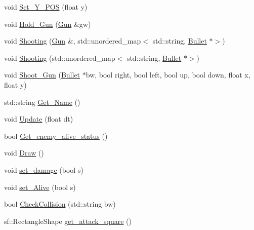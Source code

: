\begin{DoxyCompactItemize}
\item 
void \hyperlink{classSekander_1_1Enemy_a796c49f19dafbec62ce907e6ea8c90cb}{Set\+\_\+\+Y\+\_\+\+P\+OS} (float y)
\item 
void \hyperlink{classSekander_1_1Enemy_ada6336570f2bbc3294cab31247ff21a9}{Hold\+\_\+\+Gun} (\hyperlink{classSekander_1_1Gun}{Gun} \&gw)
\item 
void \hyperlink{classSekander_1_1Enemy_a53a51c2c7734f378c1ea3fb21f47de0b}{Shooting} (\hyperlink{classSekander_1_1Gun}{Gun} \&, std\+::unordered\+\_\+map$<$ std\+::string, \hyperlink{classSekander_1_1Bullet}{Bullet} $\ast$$>$)
\item 
void \hyperlink{classSekander_1_1Enemy_aaf647778a6a1a598006fc905ed98df66}{Shooting} (std\+::unordered\+\_\+map$<$ std\+::string, \hyperlink{classSekander_1_1Bullet}{Bullet} $\ast$$>$)
\item 
void \hyperlink{classSekander_1_1Enemy_a96b8ac3dfecca684c03179f01606ba38}{Shoot\+\_\+\+Gun} (\hyperlink{classSekander_1_1Bullet}{Bullet} $\ast$bw, bool right, bool left, bool up, bool down, float x, float y)
\item 
std\+::string \hyperlink{classSekander_1_1Enemy_a1db56100425ba6f05092351fc37330e6}{Get\+\_\+\+Name} ()
\item 
void \hyperlink{classSekander_1_1Enemy_aaccf2d86ea82595234cee826bc176cfa}{Update} (float dt)
\item 
bool \hyperlink{classSekander_1_1Enemy_aebe5e0b142382a975f23f3e106f70781}{Get\+\_\+enemy\+\_\+alive\+\_\+status} ()
\item 
void \hyperlink{classSekander_1_1Enemy_aa2d533f838eef9cb0ca74757ff8bcd7d}{Draw} ()
\item 
void \hyperlink{classSekander_1_1Enemy_abbebd093db5e9b28405a5ebaffb70dc4}{set\+\_\+damage} (bool s)
\item 
void \hyperlink{classSekander_1_1Enemy_a6012a5db0603ade87347e4daef7d812c}{set\+\_\+\+Alive} (bool s)
\item 
bool \hyperlink{classSekander_1_1Enemy_a61d05dd6c2d4bb57366e99a6f95d3ba4}{Check\+Collision} (std\+::string bw)
\item 
sf\+::\+Rectangle\+Shape \hyperlink{classSekander_1_1Enemy_ad6e0ecb52ea0c775b09e6b353ae7ef04}{get\+\_\+attack\+\_\+square} ()
\end{DoxyCompactItemize}
